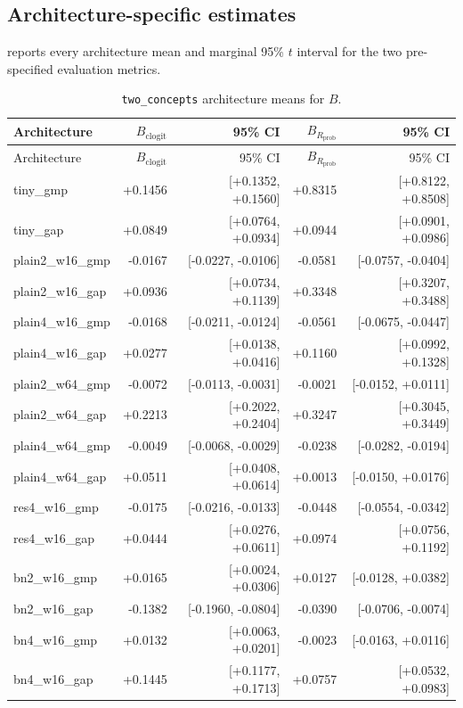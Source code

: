 \subsection{Architecture-specific estimates}\label{app:architecture-estimates}

 reports every architecture mean and marginal 95\% $t$ interval for the two pre-specified evaluation metrics.

{\scriptsize
\setlength{\tabcolsep}{3pt}
\begin{longtable}{lrrrr}
\caption{\texttt{two\_concepts} architecture means for $B$.}\label{tab:app-architecture-estimates}\\
\toprule
Architecture & $B_{\mathrm{clogit}}$ & 95\% CI & $B_{R_{\mathrm{prob}}}$ & 95\% CI \\
\midrule
\endfirsthead
\toprule
Architecture & $B_{\mathrm{clogit}}$ & 95\% CI & $B_{R_{\mathrm{prob}}}$ & 95\% CI \\
\midrule
\endhead
\bottomrule
\endfoot
tiny\_gmp & +0.1456 & [+0.1352, +0.1560] & +0.8315 & [+0.8122, +0.8508] \\
tiny\_gap & +0.0849 & [+0.0764, +0.0934] & +0.0944 & [+0.0901, +0.0986] \\
plain2\_w16\_gmp & -0.0167 & [-0.0227, -0.0106] & -0.0581 & [-0.0757, -0.0404] \\
plain2\_w16\_gap & +0.0936 & [+0.0734, +0.1139] & +0.3348 & [+0.3207, +0.3488] \\
plain4\_w16\_gmp & -0.0168 & [-0.0211, -0.0124] & -0.0561 & [-0.0675, -0.0447] \\
plain4\_w16\_gap & +0.0277 & [+0.0138, +0.0416] & +0.1160 & [+0.0992, +0.1328] \\
plain2\_w64\_gmp & -0.0072 & [-0.0113, -0.0031] & -0.0021 & [-0.0152, +0.0111] \\
plain2\_w64\_gap & +0.2213 & [+0.2022, +0.2404] & +0.3247 & [+0.3045, +0.3449] \\
plain4\_w64\_gmp & -0.0049 & [-0.0068, -0.0029] & -0.0238 & [-0.0282, -0.0194] \\
plain4\_w64\_gap & +0.0511 & [+0.0408, +0.0614] & +0.0013 & [-0.0150, +0.0176] \\
res4\_w16\_gmp & -0.0175 & [-0.0216, -0.0133] & -0.0448 & [-0.0554, -0.0342] \\
res4\_w16\_gap & +0.0444 & [+0.0276, +0.0611] & +0.0974 & [+0.0756, +0.1192] \\
bn2\_w16\_gmp & +0.0165 & [+0.0024, +0.0306] & +0.0127 & [-0.0128, +0.0382] \\
bn2\_w16\_gap & -0.1382 & [-0.1960, -0.0804] & -0.0390 & [-0.0706, -0.0074] \\
bn4\_w16\_gmp & +0.0132 & [+0.0063, +0.0201] & -0.0023 & [-0.0163, +0.0116] \\
bn4\_w16\_gap & +0.1445 & [+0.1177, +0.1713] & +0.0757 & [+0.0532, +0.0983] \\
\end{longtable}
\normalsize
}

